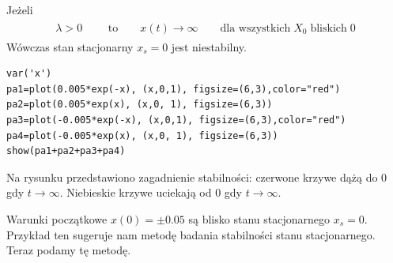 \documentclass[a4paper,12pt,polish]{sphinxmanual}
\begin{document}
Jeżeli
\label{ch1/chI023:equation-eqn9}\begin{gather}
\begin{split}\lambda >0  \quad \quad \mbox{ to} \quad \quad x(t) \to \infty  \quad \quad \mbox{dla wszystkich}  \;   X_0  \;  \mbox{bliskich} \; 0\end{split}\label{ch1/chI023-eqn9}
\end{gather}
Wówczas stan stacjonarny $x_s=0$ jest niestabilny.


\begin{verbatim}
var('x')
pa1=plot(0.005*exp(-x), (x,0,1), figsize=(6,3),color="red")
pa2=plot(0.005*exp(x), (x,0, 1), figsize=(6,3))
pa3=plot(-0.005*exp(-x), (x,0,1), figsize=(6,3),color="red")
pa4=plot(-0.005*exp(x), (x,0, 1), figsize=(6,3))
show(pa1+pa2+pa3+pa4)
\end{verbatim}


Na rysunku przedstawiono zagadnienie stabilności:  czerwone krzywe dążą do 0 gdy $t\to \infty$. Niebieskie  krzywe uciekają od   0 gdy $t\to \infty$.

Warunki początkowe $x(0)=\pm 0.05$ są blisko stanu stacjonarnego $x_s=0$. Przykład ten sugeruje nam metodę badania stabilności stanu stacjonarnego. Teraz podamy tę metodę.
\end{document}
